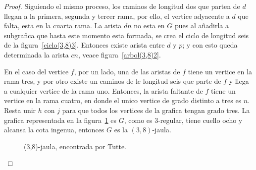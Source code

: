 \documentclass[12pt]{book}
\theoremstyle{definition}
\begin{document}
\begin{proof}
Siguiendo el mismo proceso, los caminos de longitud dos que parten de $d$ llegan
a la primera, segunda y tercer rama, por ello, el vertice adyacente a
$d$ que falta, esta en la cuarta rama. La arista $dn$ no esta en $G$
pues al añadirla a subgrafica que hasta este momento esta formada, se crea el
ciclo de longitud seis de la figura~\ref{ciclo(3,8)3}. Entonces existe arista
entre $d$ y $p$; y con esto queda determinada la arista $cn$, veace figura~\ref{arbol(3,8)2}.


En el caso del vertice $f$, por un lado, una de las aristas de $f$
tiene un vertice en la rama tres, y por otro existe un caminos de le
longitud seis que parte de $f$ y llega a cualquier vertice de la rama uno. Entonces, la arista faltante de
$f$ tiene un vertice en la rama cuatro, en donde el unico vertice de
grado distinto a tres es $n$. Resta unir $h$ con
$j$ para que todos los vertices de la grafica tengan grado tres. La
grafica representada en la figura~\ref{jaula(3,8)} es $G$, como es
3-regular, tiene cuello ocho y alcansa la cota ingenua, entonces $G$
es la $(3,8)$-jaula. 



\begin{figure}
  \centering
  \caption{(3,8)-jaula, encontrada por Tutte.} \label{jaula(3,8)}
\end{figure}

\end{proof}
\end{document}
